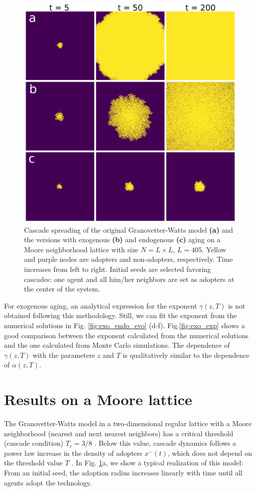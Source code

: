 \begin{figure}
    \centering \captionsetup{font=sf}
    \includegraphics[width=0.5\columnwidth]{Figs/Aging_Threshold/LATT_PLOT.png}
    \caption[Cascade spreading of the Granovetter-Watts model in a lattice]{\label{fig:evo_lat} Cascade spreading of the original Granovetter-Watts model \textbf{(a)} and the versions with exogenous \textbf{(b)} and endogenous \textbf{(c)} aging on a Moore neighborhood lattice with size $N = L \times L$, $L = 405$. Yellow and purple nodes are adopters and non-adopters, respectively. Time increases from left to right. Initial seeds are selected favoring cascades: one agent and all him/her neighbors are set as adopters at the center of the system.}
\end{figure}

For exogenous aging, an analytical expression for the exponent $\gamma(z,T)$ is not obtained following this methodology. Still, we can fit the exponent from the numerical solutions in Fig. \ref{fig:exo_endo_evo} (d-f). Fig.\ref{fig:exo_exp} shows a good comparison between the exponent calculated from the numerical solutions and the one calculated from  Monte Carlo simulations. The dependence of $\gamma(z,T)$ with the parameters $z$ and $T$ is qualitatively similar to the dependence of  $\alpha(z,T)$.

\section{\label{sec:Lattice} Results on a Moore lattice}

The Granovetter-Watts model in a two-dimensional regular lattice with a Moore neighborhood (nearest and next nearest neighbors) has a critical threshold (cascade condition) $T_c = 3/8$ \cite{centola-2007}. Below this value, cascade dynamics follows a power law increase in the density of adopters $x^{-}(t)$, which does not depend on the threshold value $T$ \cite{centola-2007}. In Fig. \ref{fig:evo_lat}a, we show a typical realization of this model: From an initial seed, the adoption radius increases linearly with time until all agents adopt the technology.

